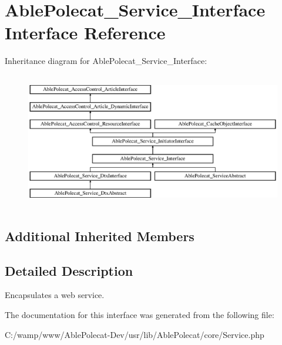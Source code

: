 \hypertarget{interface_able_polecat___service___interface}{}\section{Able\+Polecat\+\_\+\+Service\+\_\+\+Interface Interface Reference}
\label{interface_able_polecat___service___interface}
Inheritance diagram for Able\+Polecat\+\_\+\+Service\+\_\+\+Interface\+:\begin{figure}[H]
\begin{center}
\leavevmode
\includegraphics[height=5.975610cm]{interface_able_polecat___service___interface}
\end{center}
\end{figure}
\subsection*{Additional Inherited Members}


\subsection{Detailed Description}
Encapsulates a web service. 

The documentation for this interface was generated from the following file\+:\begin{DoxyCompactItemize}
\item 
C\+:/wamp/www/\+Able\+Polecat-\/\+Dev/usr/lib/\+Able\+Polecat/core/Service.\+php\end{DoxyCompactItemize}
